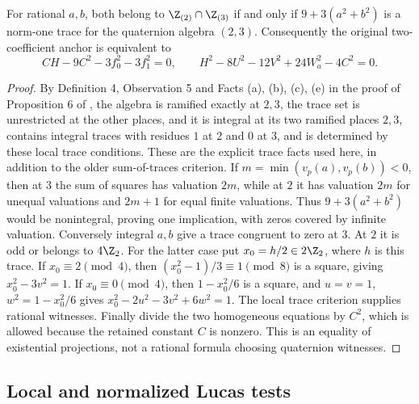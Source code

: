 \begin{lemma}\label{lem:quartic-anchor-four}
For rational $a,b$, both belong to $\Z_{(2)}\cap\Z_{(3)}$ if and only if
$9+3(a^2+b^2)$ is a norm-one trace for the quaternion algebra $(2,3)$.
Consequently the original two-coefficient anchor is equivalent to
\[
 CH-9C^2-3f_0^2-3f_1^2=0,\qquad
 H^2-8U^2-12V^2+24W_a^2-4C^2=0.
\]
\end{lemma}
\begin{proof}
By Definition 4, Observation 5 and Facts (a), (b), (c), (e) in the proof of
Proposition 6 of \cite{koenigsmann-defining}, the algebra is ramified
exactly at $2,3$, the trace set is unrestricted at the other places, and it
is integral at its two ramified places
$2,3$, contains integral traces with residues $1$ at $2$ and $0$ at $3$,
and is determined by these local trace conditions. These are the explicit
trace facts used here, in addition to the older sum-of-traces criterion.
If $m=\min(v_p(a),v_p(b))<0$, then at $3$ the sum of squares has valuation
$2m$, while at $2$ it has valuation $2m$ for unequal valuations and
$2m+1$ for equal finite valuations. Thus $9+3(a^2+b^2)$ would be
nonintegral, proving one implication, with zeros covered by infinite
valuation. Conversely integral $a,b$ give a trace congruent to zero at
$3$. At $2$ it is odd or belongs to $4\Z_2$. For the latter case put
$x_0=h/2\in2\Z_2$, where $h$ is this trace. If $x_0\equiv2\pmod4$, then
$(x_0^2-1)/3\equiv1\pmod8$ is a square, giving
$x_0^2-3v^2=1$. If $x_0\equiv0\pmod4$, then $1-x_0^2/6$ is a square,
and $u=v=1$, $w^2=1-x_0^2/6$ gives
$x_0^2-2u^2-3v^2+6w^2=1$. The local trace criterion supplies rational
witnesses. Finally divide the two homogeneous equations by $C^2$,
which is allowed because the retained constant $C$ is nonzero. This is
an equality of existential projections, not a rational formula choosing
quaternion witnesses.
\end{proof}

\subsection{Local and normalized Lucas tests}

